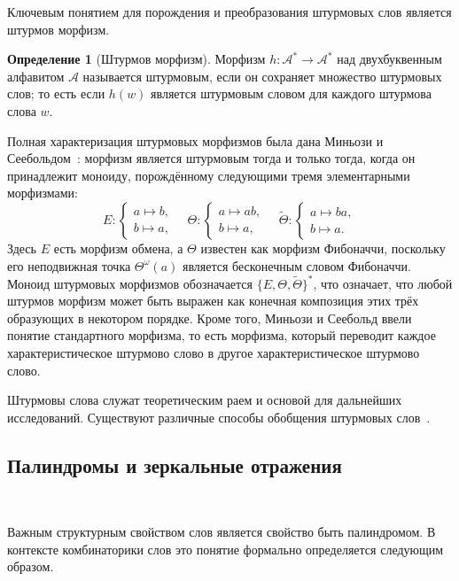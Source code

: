 \documentclass[a4paper,14pt]{extreport}
\theoremstyle{plain}
\theoremstyle{definition}
\newtheorem{definition}{Определение}[section]
\theoremstyle{remark}
\begin{document}
Ключевым понятием для порождения и преобразования штурмовых слов является штурмов морфизм.

\begin{definition}[Штурмов морфизм]
	Морфизм $h: \mathcal{A}^* \to \mathcal{A}^*$ над двухбуквенным алфавитом $\mathcal{A}$ называется штурмовым, если он сохраняет множество штурмовых слов; то есть если $h(w)$ является штурмовым словом для каждого штурмова слова $w$.
\end{definition}

Полная характеризация штурмовых морфизмов была дана Миньози и Сеебольдом~\cite{Mignosi}: морфизм является штурмовым тогда и только тогда, когда он принадлежит моноиду, порождённому следующими тремя элементарными морфизмами:
\begin{equation}
	E : 
	\begin{cases}
		a \mapsto b,\\
		b \mapsto a,
	\end{cases}
	\quad
	\Theta :
	\begin{cases}
		a \mapsto ab,\\
		b \mapsto a,
	\end{cases}
	\quad
	\tilde{\Theta} :
	\begin{cases}
		a \mapsto ba,\\
		b \mapsto a.
	\end{cases}
\end{equation}
Здесь $E$ есть морфизм обмена, а $\Theta$ известен как морфизм Фибоначчи, поскольку его неподвижная точка $\Theta^\omega(a)$ является бесконечным словом Фибоначчи. Моноид штурмовых морфизмов обозначается $\{E,\Theta,\tilde{\Theta}\}^*$, что означает, что любой штурмов морфизм может быть выражен как конечная композиция этих трёх образующих в некотором порядке. Кроме того, Миньози и Сеебольд ввели понятие стандартного морфизма, то есть морфизма, который переводит каждое характеристическое штурмово слово в другое характеристическое штурмово слово.

Штурмовы слова служат теоретическим раем и основой для дальнейших исследований. Существуют различные способы обобщения штурмовых слов~\cite{Belov}.
\subsection{Палиндромы и зеркальные отражения}~\label{sec2.1.2}

Важным структурным свойством слов является свойство быть палиндромом. В контексте комбинаторики слов это понятие формально определяется следующим образом.
\end{document}
